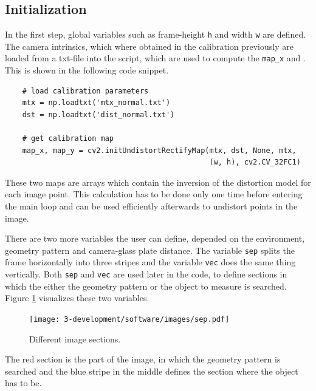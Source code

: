 \subsection{Initialization}
In the first step, global variables such as frame-height \texttt{h} and width \texttt{w} are defined.
The camera intrinsics, which where obtained in the calibration previously are loaded from a txt-file into the script, which are used to compute the \texttt{map\_x} and .
This is shown in the following code snippet.
\begin{lstlisting}
	# load calibration parameters
	mtx = np.loadtxt('mtx_normal.txt')
	dst = np.loadtxt('dist_normal.txt')

	# get calibration map
	map_x, map_y = cv2.initUndistortRectifyMap(mtx, dst, None, mtx,
	                                           (w, h), cv2.CV_32FC1)
\end{lstlisting}
These two maps are arrays which contain the inversion of the distortion model for each image point.
This calculation has to be done only one time before entering the main loop and can be used efficiently afterwards to undistort points in the image.

There are two more variables the user can define, depended on the environment, geometry pattern and camera-glass plate distance.
The variable \texttt{sep} splits the frame horizontally into three stripes and the variable \texttt{vec} does the same thing vertically.
Both \texttt{sep} and \texttt{vec} are used later in the code, to define sections in which the either the geometry pattern or the object to measure is searched.
Figure \ref{development:sep} visualizes these two variables.
\begin{figure}[ht]
	\centering
	\texttt{[image: 3-development/software/images/sep.pdf]}
	\caption{Different image sections.\label{development:sep}}
\end{figure}
The red section is the part of the image, in which the geometry pattern is searched and the blue stripe in the middle defines the section where the object has to be.

\newpage
